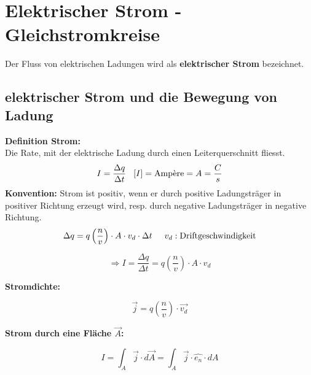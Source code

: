 \section{Elektrischer Strom - Gleichstromkreise}

Der Fluss von elektrischen Ladungen wird als \textbf{elektrischer Strom} bezeichnet.

\subsection{elektrischer Strom und die Bewegung von Ladung}
\textbf{Definition Strom:}\\
Die Rate, mit der elektrische Ladung durch einen Leiterquerschnitt fliesst.
\[
    I = \frac{\Delta q}{\Delta t} \hspace{3mm} [I] = \text{Ampère} = A = \frac{C}{s}
\]
\textbf{Konvention:} Strom ist positiv, wenn er durch positive Ladungsträger in positiver Richtung erzeugt wird, resp. durch negative Ladungsträger in negative Richtung.
\[
    \Delta q = q\left( \frac{n}{v} \right) \cdot A \cdot v_d \cdot \Delta t \hspace{5mm} v_d: \text{Driftgeschwindigkeit}
\]
\begin{formulabox}
    \[
        \Rightarrow I = \frac{\Delta q}{\Delta t}  = q\left( \frac{n}{v} \right) \cdot A \cdot v_d
    \]
\end{formulabox}
\textbf{Stromdichte:}
\begin{formulabox}
    \[
        \Vec{j} = q \left( \frac{n}{v}\right) \cdot \Vec{v_d}
    \]
\end{formulabox}
\textbf{Strom durch eine Fläche $\Vec{A}$:}
\begin{formulabox}
    \[
        I = \int_A \Vec{j} \cdot d \Vec{A} = \int_A \Vec{j} \cdot \hat{e_n} \cdot dA
    \]
\end{formulabox}

